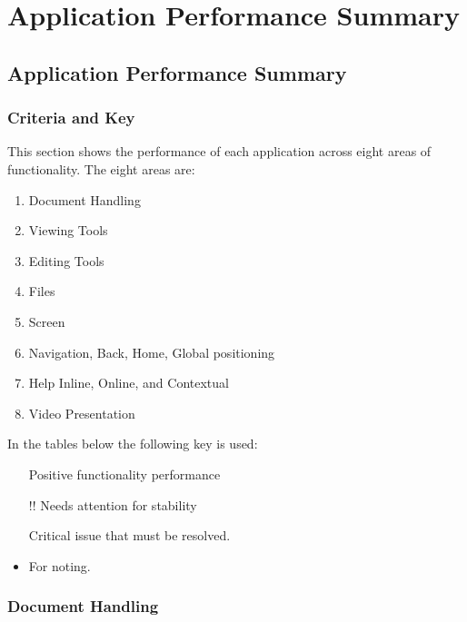 

\chapter{Application Performance Summary\label{Appendix:PerformanceSummary}}





\section{Application Performance Summary}


\subsection{Criteria and Key}
This section shows the performance of each application across eight areas of functionality. The eight areas are:
\begin{enumerate}
    \item Document Handling
    \item Viewing Tools
    \item Editing Tools
    \item Files
    \item Screen
    \item Navigation, Back, Home, Global positioning
    \item Help Inline, Online, and Contextual
    \item Video Presentation
    
    
\end{enumerate}

\noindent In the tables below the following key is used:
\begin{itemize}
	\item[\color{green}\tick]\color{black} Positive functionality performance
    \item [\color{amber}!!]\color{black} Needs attention for stability
     \item [\color{red}\cross]\color{black} Critical issue that must be resolved.
     \item For noting.
\end{itemize}

\newpage
\subsection{Document Handling}


